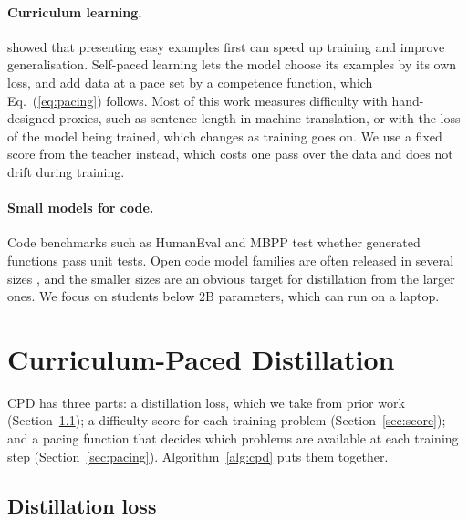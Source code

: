 \documentclass{article} %
\begin{document}
\paragraph{Curriculum learning.}
\citet{bengio2009curriculum} showed that presenting easy examples first can speed up training and improve generalisation.
Self-paced learning \citep{kumar2010selfpaced} lets the model choose its examples by its own loss, and \citet{platanios2019competence} add data at a pace set by a competence function, which Eq.~(\ref{eq:pacing}) follows.
Most of this work measures difficulty with hand-designed proxies, such as sentence length in machine translation, or with the loss of the model being trained, which changes as training goes on.
We use a fixed score from the teacher instead, which costs one pass over the data and does not drift during training.

\paragraph{Small models for code.}
Code benchmarks such as HumanEval \citep{chen2021evaluating} and MBPP \citep{austin2021program} test whether generated functions pass unit tests.
Open code model families are often released in several sizes \citep{roziere2023code}, and the smaller sizes are an obvious target for distillation from the larger ones.
We focus on students below 2B parameters, which can run on a laptop.

\section{Curriculum-Paced Distillation}
\label{sec:method}

CPD has three parts: a distillation loss, which we take from prior work (Section~\ref{sec:loss}); a difficulty score for each training problem (Section~\ref{sec:score}); and a pacing function that decides which problems are available at each training step (Section~\ref{sec:pacing}).
Algorithm~\ref{alg:cpd} puts them together.

\subsection{Distillation loss}
\label{sec:loss}
\end{document}

